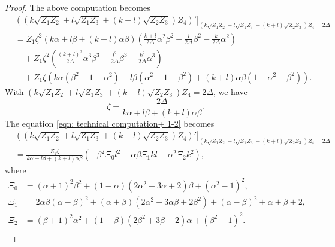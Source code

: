 \documentclass[11pt,letterpaper]{amsart}
\theoremstyle{definition}
\numberwithin{equation}{section}
\begin{document}
\begin{proof}
The above computation becomes
\begin{equation}
\label{eqn: technical computation+ 1-2}
\begin{split}
&\left.\left(\left(k\sqrt{Z_1Z_2}+l\sqrt{Z_1Z_3}+(k+l)\sqrt{Z_2Z_3}\right)Z_4\right)'\right|_{\left(k\sqrt{Z_1Z_2}+l\sqrt{Z_1Z_3}+(k+l)\sqrt{Z_2Z_3}\right)Z_4=2\Delta}
\\
&=Z_1\zeta^2(k\alpha+l\beta+(k+l)\alpha\beta)\left(\frac{k+l}{2\Delta}\alpha^2\beta^2-\frac{l}{2\Delta}\beta^2-\frac{k}{2\Delta}\alpha^2\right)\\
&\quad +Z_1\zeta^2\left(\frac{(k+l)^2}{2\Delta}\alpha^3\beta^3-\frac{l^2}{2\Delta}\beta^3-\frac{k^2}{2\Delta}\alpha^3\right)\\
&\quad +Z_1\zeta(k\alpha(\beta^2-1-\alpha^2)+l\beta(\alpha^2-1-\beta^2)+(k+l)\alpha\beta(1-\alpha^2-\beta^2)).
\end{split}
\end{equation}
With $\left(k\sqrt{Z_1Z_2}+l\sqrt{Z_1Z_3}+(k+l)\sqrt{Z_2Z_3}\right)Z_4=2\Delta$, we have 
\begin{equation}
\label{eqn_homogenized boundary}
\zeta=\frac{2\Delta}{k\alpha+l\beta+(k+l)\alpha\beta}.
\end{equation}
The equation \eqref{eqn: technical computation+ 1-2} becomes
\begin{equation}
\label{eqn: technical computation+ 1-3}
\begin{split}
&\left.\left(\left(k\sqrt{Z_1Z_2}+l\sqrt{Z_1Z_3}+(k+l)\sqrt{Z_2Z_3}\right)Z_4\right)'\right|_{\left(k\sqrt{Z_1Z_2}+l\sqrt{Z_1Z_3}+(k+l)\sqrt{Z_2Z_3}\right)Z_4=2\Delta}
\\
&=\frac{Z_1\zeta}{k\alpha+l\beta+(k+l)\alpha\beta}(-\beta^2\Xi_0 l^2-\alpha\beta\Xi_1kl-\alpha^2\Xi_2k^2),
\end{split}
\end{equation}
where
\begin{equation}
\begin{split}
\Xi_0&=(\alpha+1)^2 \beta^2+(1-\alpha)(2\alpha^2+3\alpha+2) \beta+( \alpha^2-1)^2,\\
\Xi_1&=2\alpha\beta(\alpha-\beta)^2+(\alpha+\beta)(2\alpha^2-3\alpha\beta+2\beta^2)+(\alpha-\beta)^2+\alpha+\beta+2,\\
\Xi_2&=(\beta+1)^2\alpha^2+(1-\beta)(2\beta^2+3\beta+2)\alpha+(\beta^2-1)^2.\\
\end{split}
\end{equation}


\end{proof}
\end{document}
